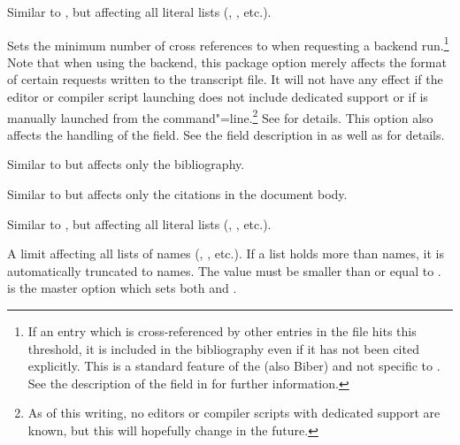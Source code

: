 \documentclass{ltxdockit}[2011/03/25]
\newcommand*{\biber}{Biber\xspace}
\begin{document}
\begin{optionlist}

Similar to , but affecting all literal lists (, , etc.).


Sets the minimum number of cross references to  when requesting a backend run.\footnote{If an entry which is cross-referenced by other entries in the  file hits this threshold, it is included in the bibliography even if it has not been cited explicitly. This is a standard feature of the \bibtex (also \biber) and not specific to . See the description of the  field in  for further information.} Note that when using the \bibtex backend, this package option merely affects the format of certain requests written to the transcript file. It will not have any effect if the editor or compiler script launching \bibtex does not include dedicated  support or if \bibtex is manually launched from the command"=line.\footnote{As of this writing, no \latex editors or compiler scripts with dedicated  support are known, but this will hopefully change in the future.} See  for details. This option also affects the handling of the  field. See the field description in  as well as  for details.


Similar to  but affects only the bibliography.


Similar to  but affects only the citations in the document body.


Similar to , but affecting all literal lists (, , etc.).


A limit affecting all lists of names (, , etc.). If a list holds more than  names, it is automatically truncated to  names. The  value must be smaller than or equal to .  is the master option which sets both  and .



\end{optionlist}
\end{document}
